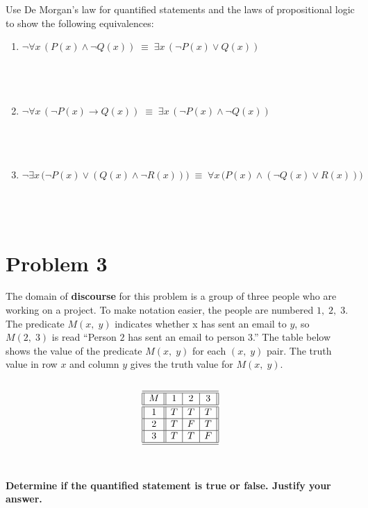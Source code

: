 \documentclass{amsart}
\theoremstyle{definition}
\theoremstyle{Exercise}
\theoremstyle{remark}
\theoremstyle{rule}
\numberwithin{equation}{section}
\begin{document}
Use De Morgan's law for quantified statements and the laws of propositional logic to show the following equivalences:\\
\begin{enumerate}[label=(\alph*)]
\item $\neg \forall x \, \left(P(x) \land \neg Q(x) \right)\; \equiv \; \exists x \, \left(\neg P(x) \lor  Q(x) \right)$\\\\
\\\\
\item $\neg \forall x \, \left(\neg P(x) \to Q(x) \right)\; \equiv \; \exists x \, \left(\neg P(x) \land  \neg Q(x) \right)$\\\\
\\\\
\item $\neg \exists x \, \big(\neg P(x) \lor \left(Q(x) \land \neg R(x) \right)\big)\; \equiv \; \forall x \,\big( P(x) \land \left( \neg Q(x) \lor R(x) \right)\big)$\\\\
\\\\
\end{enumerate}


\newpage




\section*{Problem 3}

The domain of {\bf discourse} for this problem is a group of three people who are working on a project. To make notation easier, the people are numbered $1, \;2, \;3$. The predicate $M(x,\; y)$ indicates whether x has sent an email to $y$, so $M(2, \;3)$ is read ``Person $2$ has sent an email to person $3$.'' The table below shows the value of the predicate $M(x,\;y)$ for each $(x,\;y)$ pair. The truth value in row $x$ and column $y$ gives the truth value for $M(x,\;y)$.\\\\
\[
 \begin{array}{||c||c|c|c||}
\hline\hline
M & 1 & 2& 3\\
\hline\hline
1 &T & T & T\\
\hline
2 &T & F & T\\
\hline
3 &T & T & F\\
\hline\hline
    \end{array}
    \]\\\\
{\bf Determine if the quantified statement is true or false. Justify your answer.}\\
\end{document}
